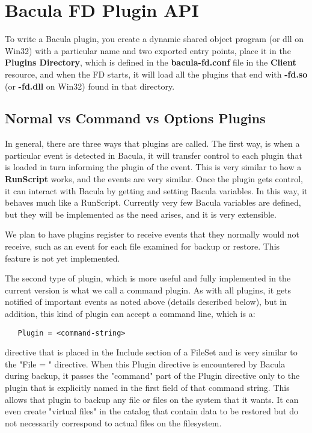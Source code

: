 
\chapter{Bacula FD Plugin API}
To write a Bacula plugin, you create a dynamic shared object program (or dll on
Win32) with a particular name and two exported entry points, place it in the
{\bf Plugins Directory}, which is defined in the {\bf bacula-fd.conf} file in
the {\bf Client} resource, and when the FD starts, it will load all the plugins
that end with {\bf -fd.so} (or {\bf -fd.dll} on Win32) found in that directory.

\section{Normal vs Command vs Options Plugins}
In general, there are three ways that plugins are called. The first way, is when
a particular event is detected in Bacula, it will transfer control to each
plugin that is loaded in turn informing the plugin of the event.  This is very
similar to how a {\bf RunScript} works, and the events are very similar.  Once
the plugin gets control, it can interact with Bacula by getting and setting
Bacula variables.  In this way, it behaves much like a RunScript.  Currently
very few Bacula variables are defined, but they will be implemented as the need
arises, and it is very extensible.

We plan to have plugins register to receive events that they normally would
not receive, such as an event for each file examined for backup or restore.
This feature is not yet implemented.

The second type of plugin, which is more useful and fully implemented in the
current version is what we call a command plugin.  As with all plugins, it gets
notified of important events as noted above (details described below), but in
addition, this kind of plugin can accept a command line, which is a:

\begin{verbatim}
   Plugin = <command-string>
\end{verbatim}

directive that is placed in the Include section of a FileSet and is very
similar to the "File = " directive.  When this Plugin directive is encountered
by Bacula during backup, it passes the "command" part of the Plugin directive
only to the plugin that is explicitly named in the first field of that command
string.  This allows that plugin to backup any file or files on the system that
it wants. It can even create "virtual files" in the catalog that contain data
to be restored but do not necessarily correspond to actual files on the
filesystem.

